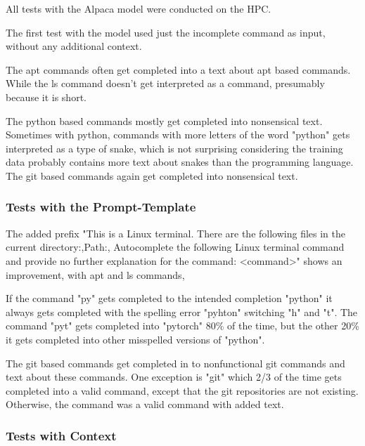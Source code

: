 All tests with the Alpaca model were conducted on the HPC.


The first test with the model used just the incomplete command as input, without any additional context.



The apt commands often get completed into a text about apt based commands. While the ls command doesn't get interpreted as a command, presumably because it is short.




The python based commands mostly get completed into nonsensical text. Sometimes with python, commands with more letters of the word "python" gets interpreted as a type of snake, which is not surprising considering the training data probably contains more text about snakes than the programming language. The git based commands again get completed into nonsensical text.




\subsubsection{Tests with the Prompt-Template}



The added prefix  "This is a Linux terminal. There are the following files in the current  directory:,Path:, Autocomplete the following Linux terminal command and provide no further explanation for the command: <command>" shows an improvement, with apt and ls commands,


 

If the command "py" gets completed to the intended completion "python" it always gets completed with the spelling error "pyhton" switching "h" and "t". The command "pyt" gets completed into "pytorch" 80\% of the time, but the other 20\% it gets completed into other misspelled versions of "python".


The git based commands get completed in to nonfunctional git commands and text about these commands. One exception is "git" which 2/3 of the time gets completed into a valid command, except that the git repositories are not existing. Otherwise, the command was a valid command  with added text. 




\subsubsection{Tests with Context}



